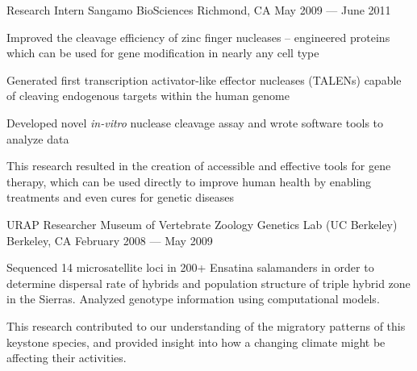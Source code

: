 

\begin{cventries}

  \cventry
  {Research Intern} %
  {Sangamo BioSciences} %
  {Richmond, CA} %
  {May 2009 --- June 2011} %
  {
    \begin{cvitems} %
    \item {Improved the cleavage efficiency of zinc finger nucleases – engineered proteins which can be used for gene modification in nearly any cell type}
    \item {Generated first transcription activator-like effector nucleases (TALENs) capable of cleaving endogenous targets within the human genome}
    \item {Developed novel {\em in-vitro} nuclease cleavage assay and wrote software tools to analyze data}
    \item This research resulted in the creation of accessible and effective tools for gene therapy, which can be used directly to improve human health by enabling treatments and even cures for genetic diseases
    \end{cvitems}
  }

  \cventry
  {URAP Researcher} %
  {Museum of Vertebrate Zoology Genetics Lab (UC Berkeley)} %
  {Berkeley, CA} %
  {February 2008 --- May 2009} %
  {
    \begin{cvitems} %
    \item {Sequenced 14 microsatellite loci in 200+ Ensatina salamanders in order to determine dispersal rate of hybrids and population structure of triple hybrid zone in the Sierras. Analyzed genotype information using computational models.}
    \item {This research contributed to our understanding of the migratory patterns of this keystone species, and provided insight into how a changing climate might be affecting their activities.}
    \end{cvitems}
  }

\end{cventries}
